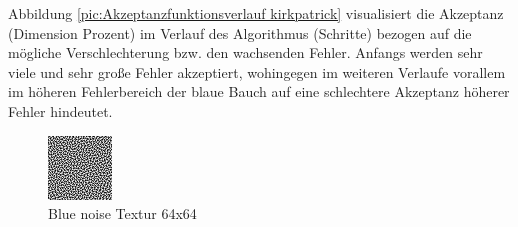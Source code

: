 Abbildung \ref{pic:Akzeptanzfunktionsverlauf kirkpatrick} visualisiert die Akzeptanz (Dimension Prozent) im Verlauf 
des Algorithmus (Schritte) bezogen auf die mögliche Verschlechterung bzw. den wachsenden Fehler. Anfangs werden sehr viele 
und sehr große Fehler akzeptiert, wohingegen im weiteren Verlaufe vorallem im höheren Fehlerbereich der blaue Bauch auf eine 
schlechtere Akzeptanz höherer Fehler hindeutet.

\begin{figure}[H]
    \centering
    \begin{minipage}[t]{0.45\linewidth}
        \centering
        \includegraphics[interpolate=false,width=\linewidth]{content/simulatedAnnealing/Bilder/LDR_RGBA_0_64-RGBA_r_channel.png}
        \caption{Blue noise Textur 64x64}
    \end{minipage}
    \hfill
    \begin{minipage}[t]{0.45\linewidth}
        \centering

\end{minipage}
\end{figure}
